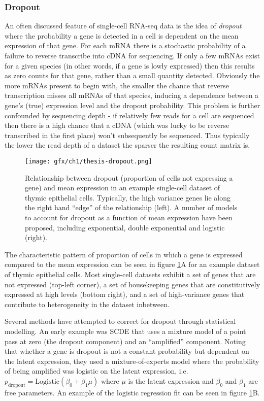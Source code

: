 \subsubsection{Dropout} \label{sec:intro_dropout}

An often discussed feature of single-cell RNA-seq data is the idea of \emph{dropout} where the probability a gene is detected in a cell is dependent on the mean expression of that gene. For each mRNA there is a stochastic probability of a failure to reverse transcribe into cDNA for sequencing. If only a few mRNAs exist for a given species (in other words, if a gene is lowly expressed) then this results as zero counts for that gene, rather than a small quantity detected. Obviously the more mRNAs present to begin with, the smaller the chance that reverse transcription misses all mRNAs of that species, inducing a dependence between a gene's (true) expression level and the dropout probability. This problem is further confounded by sequencing depth - if relatively few reads for a cell are sequenced then there is a high chance that a cDNA (which was lucky to be reverse transcribed in the first place) won't subsequently be sequenced. Thus typically the lower the read depth of a dataset the sparser the resulting count matrix is.

\begin{figure}
\centering
  \texttt{[image: gfx/ch1/thesis-dropout.png]}
  \caption[Mean-dropout relationship in an example single-cell dataset.]{Relationship between dropout (proportion of cells not expressing a gene) and mean expression in an example single-cell dataset of thymic epithelial cells. Typically, the high variance genes lie along the right hand ``edge'' of the relationship (left). A number of models to account for dropout as a function of mean expression have been proposed, including exponential, double exponential and logistic (right).} \label{fig:intro_dropout}
\end{figure}

The characteristic pattern of proportion of cells in which a gene is expressed compared to the mean expression can be seen in figure \ref{fig:intro_dropout}A for an example dataset of thymic epithelial cells. Most single-cell datasets exhibit a set of genes that are not expressed (top-left corner), a set of housekeeping genes that are constitutively expressed at high levels (bottom right), and a set of high-variance genes that contribute to heterogeneity in the dataset inbetween.

Several methods have attempted to correct for dropout through statistical modelling. An early example was SCDE \cite{Kharchenko2014} that uses a mixture model of a point pass at zero (the dropout component) and an ``amplified'' component. Noting that whether a gene is dropout is not a constant probability but dependent on the latent expression, they used a mixture-of-experts model where the probability of being amplified was logistic on the latent expression, i.e. $p_{\text{dropout}} = \text{Logistic}(\beta_0 + \beta_1 \mu)$ where $\mu$ is the latent expression and $\beta_0$ and $\beta_1$ are free parameters. An example of the logistic regression fit can be seen in figure \ref{fig:intro_dropout}B.

